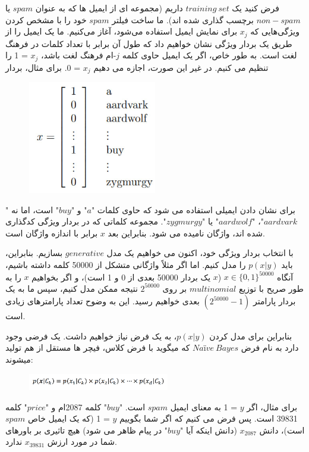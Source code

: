 \documentclass[12pt]{article}
\begin{document}
فرض کنید یک $ training\:set$ داریم (مجموعه ای از ایمیل ها که به عنوان $spam$ یا $non-spam$ برچسب گذاری شده اند). ما ساخت فیلتر $spam$ خود را با مشخص کردن ویژگی‌هایی که $x_j$ برای نمایش ایمیل استفاده می‌شود، آغاز می‌کنیم.
ما یک ایمیل را از طریق یک بردار ویژگی نشان خواهیم داد که طول آن برابر با تعداد کلمات در فرهنگ لغت است. به طور خاص، اگر یک ایمیل حاوی کلمه $j$-ام فرهنگ لغت باشد، $x_j$ = 1 را تنظیم می کنیم. در غیر این صورت، اجازه می دهیم $x_j$ = 0. برای مثال، بردار
\begin{figure}[h]
  \centering
  \includegraphics[width=0.5\textwidth]{figs/7.png}
  \label{7}
\end{figure}
برای نشان دادن ایمیلی استفاده می شود که حاوی کلمات "$a$" و "$buy$" است، اما نه "$aardvark$"، "$aardwolf$" یا "$zygmurgy$". مجموعه کلماتی که در بردار ویژگی کدگذاری شده اند، واژگان نامیده می شود. بنابراین بعد $x$ برابر با اندازه واژگان است.

با انتخاب بردار ویژگی خود، اکنون می خواهیم یک مدل $generative$ بسازیم. بنابراین، باید $p(x|y)$ را مدل کنیم. اما اگر مثلاً واژگانی متشکل از 50000 کلمه داشته باشیم، آنگاه $x \in \{0, 1\}^{50000}$ ($x$ یک بردار 50000 بعدی از 0 و 1 است)، و اگر بخواهیم $x$ را به طور صریح با توزیع $multinomial$ بر روی $2^{50000}$ نتیجه ممکن مدل کنیم، سپس ما به یک بردار پارامتر $(2^{50000}-1)$ بعدی خواهیم رسید. این به وضوح تعداد پارامترهای زیادی است.
 
 بنابراین برای مدل کردن $p(x|y)$، به یک فرض نیاز خواهیم داشت.
یک فرضی وجود دارد به نام فرض $Naïve\:Bayes$ که میگوید با فرض کلاس، فیچر ها مستقل از هم تولید میشوند:
\begin{figure}[h]
  \centering
  \includegraphics[width=0.55\textwidth]{figs/6.png}
  \label{6}
\end{figure}

برای مثال، اگر $y$ = 1 به معنای ایمیل $spam$ است. "$buy$" کلمه 2087ام و "$price$" کلمه 39831 است. پس فرض می کنیم که اگر شما بگوییم $y$ = 1 (که یک ایمیل خاص $spam$ است)، دانش $x_{2087}$ (دانش اینکه آیا "$buy$" در پیام ظاهر می شود) هیچ تاثیری بر باورهای شما در مورد ارزش $x_{39831}$ ندارد. 
\end{document}
